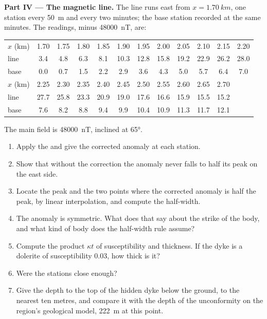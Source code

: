 \begin{problem}
\medskip\noindent\textbf{Part IV --- The magnetic line.} The line runs
east from $x = \qty{1.70}{km}$, one station every \qty{50}{m} and every
two minutes; the base station recorded at the same minutes. The
readings, minus \qty{48000}{nT}, are:
\begin{center}
\small
\setlength{\tabcolsep}{3.5pt}
\begin{tabular}{lccccccccccc}
\hline
$x$ (km) & 1.70 & 1.75 & 1.80 & 1.85 & 1.90 & 1.95 & 2.00 & 2.05 & 2.10 & 2.15 & 2.20 \\
line & 3.4 & 4.8 & 6.3 & 8.1 & 10.3 & 12.8 & 15.8 & 19.2 & 22.9 & 26.2 & 28.0 \\
base & 0.0 & 0.7 & 1.5 & 2.2 & 2.9 & 3.6 & 4.3 & 5.0 & 5.7 & 6.4 & 7.0 \\
\hline
$x$ (km) & 2.25 & 2.30 & 2.35 & 2.40 & 2.45 & 2.50 & 2.55 & 2.60 & 2.65 & 2.70 & \\
line & 27.7 & 25.8 & 23.3 & 20.9 & 19.0 & 17.6 & 16.6 & 15.9 & 15.5 & 15.2 & \\
base & 7.6 & 8.2 & 8.8 & 9.4 & 9.9 & 10.4 & 10.9 & 11.3 & 11.7 & 12.1 & \\
\hline
\end{tabular}
\end{center}
The main field is \qty{48000}{nT}, inclined at \ang{65}.
\begin{enumerate}[resume]
\item Apply the  and give the corrected anomaly at
  each station.
\item Show that without the correction the anomaly never falls to half
  its peak on the east side.
\item Locate the peak and the two points where the corrected anomaly is
  half the peak, by linear interpolation, and compute the half-width.
\item The anomaly is symmetric. What does that say about the strike of
  the body, and what kind of body does the half-width rule assume?
\item Compute the product $\kappa t$ of susceptibility and thickness.
  If the dyke is a dolerite of susceptibility \num{0.03}, how thick is
  it?
\item Were the stations close enough?
\item Give the depth to the top of the hidden dyke below the ground, to
  the nearest ten metres, and compare it with the depth of the
  unconformity on the region's geological model, \qty{222}{m} at this
  point.
\end{enumerate}
\end{problem}
